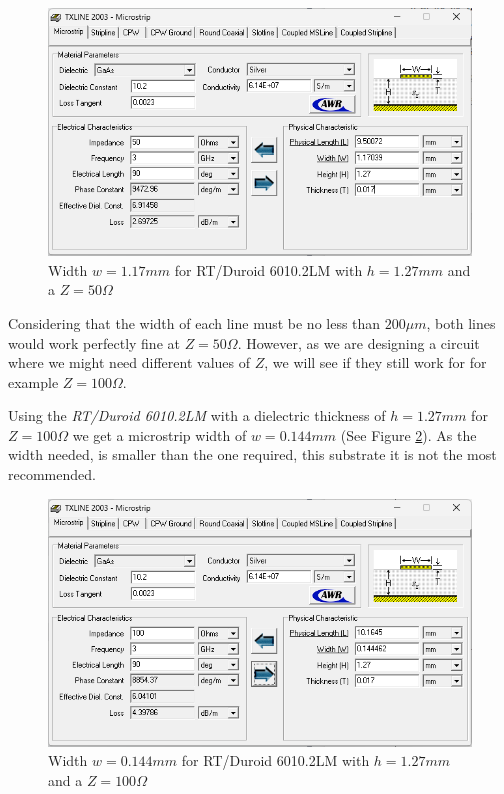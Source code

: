 \documentclass[12pt]{report} %
\begin{document}
\begin{figure}[htbp]
    \centering
    \includegraphics[width=\textwidth]{images/previous_work/txline_tool_duroid_6010.2lm_h_1_27_mm_50_ohm.png}
    \caption{Width $w = 1.17 mm$ for RT/Duroid 6010.2LM with $h = 1.27 mm$ and a $Z = 50 \Omega$}
    \label{fig:previous_work:duroid_6010.2lm_h_1_27_mm_50_ohm}
\end{figure}

Considering that the width of each line must be no less than $200 \mu m$, both lines would work perfectly fine at $Z = 50 \Omega$. However, as we are designing a circuit where we might need different values of $Z$, we will see if they still work for for example $Z = 100 \Omega$.

Using the \textit{RT/Duroid 6010.2LM} with  a dielectric thickness of $h = 1.27 mm$ for $Z = 100 \Omega$ we get a microstrip width of $w = 0.144mm$ (See Figure \ref{fig:previous_work:duroid_6010.2lm_h_1_27_mm_100_ohm}). As the width needed, is smaller than the one required, this substrate it is not the most recommended.

\begin{figure}[htbp]
    \centering
    \includegraphics[width=\textwidth]{images/previous_work/txline_tool_duroid_6010.2lm_h_1_27_mm_100_ohm.png}
    \caption{Width $w = 0.144 mm$ for RT/Duroid 6010.2LM with $h = 1.27 mm$ and a $Z = 100 \Omega$}
    \label{fig:previous_work:duroid_6010.2lm_h_1_27_mm_100_ohm}
\end{figure}
\end{document}
